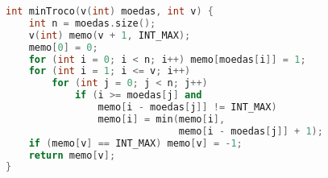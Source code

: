 \begin{lstlisting}[language = C++]
int minTroco(v(int) moedas, int v) {
	int n = moedas.size();
	v(int) memo(v + 1, INT_MAX);
	memo[0] = 0;
    for (int i = 0; i < n; i++) memo[moedas[i]] = 1;
    for (int i = 1; i <= v; i++)
    	for (int j = 0; j < n; j++)
        	if (i >= moedas[j] and 
        	    memo[i - moedas[j]] != INT_MAX)
            	memo[i] = min(memo[i], 
            	              memo[i - moedas[j]] + 1);
    if (memo[v] == INT_MAX) memo[v] = -1;
    return memo[v];
}
\end{lstlisting}